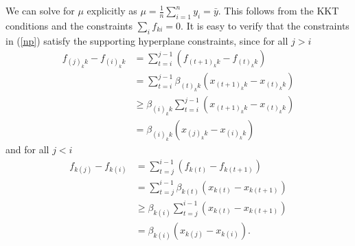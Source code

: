We can solve for $\mu$ explicitly as  
$\mu = \frac{1}{n} \sum_{i=1}^n y_i = \bar{y}$.  This follows from the
KKT conditions
and the constraints $\sum_i f_{ki} = 0$.
It is easy to verify that the constraints in (\ref{np}) satisfy the
supporting hyperplane constraints, since
for all $j > i$
\begin{align*}
  f_{(j)_kk}-f_{(i)_kk}  & = \sum\limits_{t=i}^{j-1}(f_{(t+1)_kk}-f_{(t)_kk}) \\
   &= \sum\limits_{t=i}^{j-1}\beta_{(t)_kk}(x_{(t+1)_kk}-x_{(t)_kk}) \\
   &\geq \beta_{(i)_kk}\sum\limits_{t=i}^{j-1}(x_{(t+1)_kk}-x_{(t)_kk}) \\
  & = \beta_{(i)_kk}(x_{(j)_kk}-x_{(i)_kk}) 
\end{align*}
and for all $j < i$
\begin{align*}
f_{k(j)}-f_{k(i)} & =
    \sum\limits_{t=j}^{i-1}(f_{k(t)}-f_{k(t+1)}) \\
     & = \sum\limits_{t=j}^{i-1}\beta_{k(t)}(x_{k(t)}-x_{k(t+1)}) \\
     &\geq \beta_{k(i)}\sum\limits_{t=j}^{i-1}(x_{k(t)}-x_{k(t+1)}) \\
     & = \beta_{k(i)}(x_{k(j)}-x_{k(i)}).
\end{align*}




